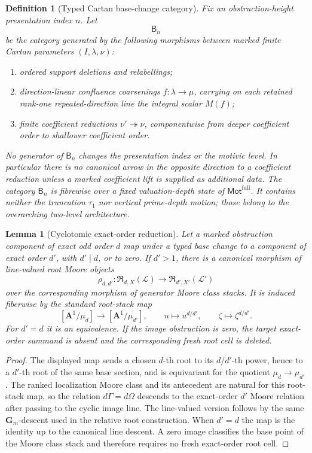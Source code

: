 \documentclass[11pt]{article}
\newtheorem{lemma}[theorem]{Lemma}
\newtheorem{definition}[theorem]{Definition}
\theoremstyle{remark}
\providecommand{\FullMot}{\mathsf{Mot}^{\mathrm{full}}}
\providecommand{\tauone}{\tau_{1}}
\begin{document}
\begin{definition}[Typed Cartan base-change category]
\label{def:typed-cartan-base-change-category}
Fix an obstruction-height presentation index $n$.  Let
\[
 \mathsf B_n
\]
be the category generated by the following morphisms between marked finite Cartan
parameters $(I,\lambda,\nu)$:
\begin{enumerate}[label=\textup{(\roman*)}]
\item ordered support deletions and relabellings;
\item direction-linear confluence coarsenings $f:\lambda\to\mu$, carrying on each
      retained rank-one repeated-direction line the integral scalar $M(f)$;
\item finite coefficient reductions $\nu'\twoheadrightarrow\nu$, componentwise from
      deeper coefficient order to shallower coefficient order.
\end{enumerate}
No generator of $\mathsf B_n$ changes the presentation index or the motivic level.  In
particular there is no
canonical arrow in the opposite direction to a coefficient reduction unless a marked
coefficient lift is supplied as additional data.
The category \(\mathsf B_n\) is fibrewise over a fixed valuation-depth state of
\(\FullMot\).  It contains neither the truncation \(\tauone\) nor vertical
prime-depth motion; those belong to the overarching two-level architecture.
\end{definition}

\begin{lemma}[Cyclotomic exact-order reduction]
\label{lem:cyclotomic-exact-order-reduction}
Let a marked obstruction component of exact odd order $d$ map under a typed base change
to a component of exact order $d'$, with $d'\mid d$, or to zero.  If $d'>1$, there is
a canonical morphism of line-valued root Moore objects
\[
 \rho_{d,d'}:
 \mathfrak R_{d,X}(\mathscr L)
 \longrightarrow
 \mathfrak R_{d',X'}(\mathscr L')
\]
over the corresponding morphism of generator Moore class stacks.  It is induced
fiberwise by the standard root-stack map
\[
 [\mathbf A^1/\mu_d]\longrightarrow[\mathbf A^1/\mu_{d'}],
 \qquad
 u\longmapsto u^{d/d'},
 \qquad
 \zeta\longmapsto\zeta^{d/d'}.
\]
For $d'=d$ it is an equivalence.  If the image obstruction is zero, the target exact-order
summand is absent and the corresponding fresh root cell is deleted.
\end{lemma}

\begin{proof}
The displayed map sends a chosen $d$-th root to its $d/d'$-th power, hence to a
$d'$-th root of the same base section, and is equivariant for the quotient
$\mu_d\to\mu_{d'}$.  The ranked localization Moore class and its antecedent are natural
for this root-stack map, so the relation $d\Gamma=d\Omega$ descends to the exact-order
$d'$ Moore relation after passing to the cyclic image line.  The line-valued version
follows by the same $\mathbf G_m$-descent used in the relative root construction.
When $d'=d$ the map is the identity up to the canonical line descent.  A zero image
classifies the base point of the Moore class stack and therefore requires no fresh
exact-order root cell.
\end{proof}
\end{document}
